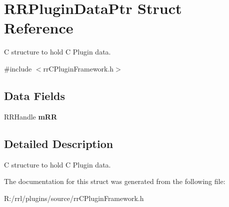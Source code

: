 \hypertarget{struct_r_r_plugin_data_ptr}{\section{R\-R\-Plugin\-Data\-Ptr Struct Reference}
\label{struct_r_r_plugin_data_ptr}
}


C structure to hold C Plugin data.  




{\ttfamily \#include $<$rr\-C\-Plugin\-Framework.\-h$>$}

\subsection*{Data Fields}
\begin{DoxyCompactItemize}
\item 
\hypertarget{struct_r_r_plugin_data_ptr_a30d1d46c1fdcc5d68194afb636390309}{R\-R\-Handle {\bfseries m\-R\-R}}\label{struct_r_r_plugin_data_ptr_a30d1d46c1fdcc5d68194afb636390309}

\end{DoxyCompactItemize}


\subsection{Detailed Description}
C structure to hold C Plugin data. 

The documentation for this struct was generated from the following file\-:\begin{DoxyCompactItemize}
\item 
R\-:/rrl/plugins/source/rr\-C\-Plugin\-Framework.\-h\end{DoxyCompactItemize}
